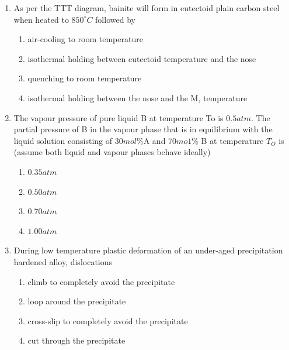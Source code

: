 \documentclass[journal]{IEEEtran}
\theoremstyle{remark}
\begin{document}
\begin{enumerate}
\item As per the TTT diagram, bainite will form in eutectoid plain carbon steel when heated to $850^\circ C$ followed by\hfill{}


\begin{enumerate}
\item  air-cooling to room temperature
\item  isothermal holding between eutectoid temperature and the nose
\item  quenching to room temperature
\item  isothermal holding between the nose and the M, temperature
\end{enumerate}

\item   The vapour pressure of pure liquid B at temperature To is $0.5 atm$. The partial pressure of B in the
vapour phase that is in equilibrium with the liquid solution consisting of $30 mol\%$A and $70 mo1\%$ B at
temperature $T_O$ is (assume both liquid and vapour phases behave ideally)

\hfill{}
\begin{multicols}{4}
\begin{enumerate}
\item  $0.35 atm$
\item $0.50 atm$
\item  $0.70 atm$
\item  $1.00 atm$
\end{enumerate}
\end{multicols}

\item  During low temperature plastic deformation of an under-aged precipitation hardened alloy, dislocations \hfill{}
\begin{enumerate}
\item  climb to completely avoid the precipitate
\item loop around the precipitate
\item  cross-slip to completely avoid the precipitate
\item  cut through the precipitate
\end{enumerate}


\end{enumerate}
\end{document}
